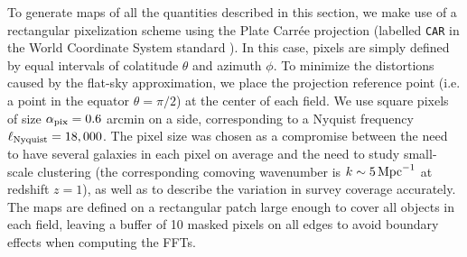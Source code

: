 \documentclass[a4paper,11pt]{article}
\begin{document}
    To generate maps of all the quantities described in this section, we make use of a rectangular pixelization scheme using the Plate Carr\'ee projection (labelled {\tt CAR} in the World Coordinate System standard \cite{2002A&A...395.1077C}). In this case, pixels are simply defined by equal intervals of colatitude $\theta$ and azimuth $\phi$. To minimize the distortions caused by the flat-sky approximation, we place the projection reference point (i.e. a point in the equator $\theta=\pi/2$) at the center of each field. We use square pixels of size $\alpha_{\rm pix}=0.6$ arcmin on a side, corresponding to a Nyquist frequency $\ell_{\rm Nyquist}=18,000$. The pixel size was chosen as a compromise between the need to have several galaxies in each pixel on average and the need to study small-scale clustering (the corresponding comoving wavenumber is $k\sim5\,{\rm Mpc}^{-1}$ at redshift $z=1$), as well as to describe the variation in survey coverage accurately. The maps are defined on a rectangular patch large enough to cover all objects in each field, leaving a buffer of 10 masked pixels on all edges to avoid boundary effects when computing the FFTs.
  
\end{document}
